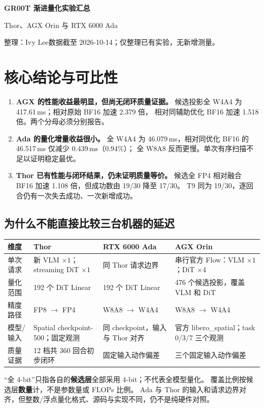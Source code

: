 \documentclass[UTF8,a4paper,11pt,fontset=fandol]{ctexart}
\newcommand{\key}[1]{\textbf{#1}}
\begin{document}
\thispagestyle{plain}
{\huge\bfseries GR00T 渐进量化实验汇总}\par
{\large Thor、AGX Orin 与 RTX 6000 Ada}\par
{\small 整理：Ivy Lee\quad 数据截至 2026-10-14；仅整理已有实验，无新增测量。}
\vspace{5pt}

\section{核心结论与可比性}
\begin{enumerate}
  \item \key{AGX 的性能收益最明显，但尚无闭环质量证据。}
  候选投影全 W4A4 为 417.61\,ms；相对原始 BF16 加速 2.379 倍，
  相对同辅助优化 BF16 加速 1.518 倍。两个分母必须分别报告。
  \item \key{Ada 的量化增量收益很小。}
  全 W4A4 为 46.079\,ms，相对同优化 BF16 的 46.517\,ms 仅减少 0.439\,ms（0.94\%）；
  全 W8A8 反而更慢。单次有序扫描不足以证明稳定最优。
  \item \key{Thor 已有性能与闭环结果，仍未证明质量等价。}
  候选全 FP4 相对融合 BF16 加速 1.108 倍，但成功数由 19/30 降至 17/30。
  T9 同为 19/30，逐回合仍有一次失去成功、一次新增成功。
\end{enumerate}

\subsection{为什么不能直接比较三台机器的延迟}
\begin{center}\small
\begin{tabularx}{\linewidth}{lXXX}
\toprule
维度 & Thor & RTX 6000 Ada & AGX Orin\\\midrule
单次请求 & 新 VLM $\times1$；streaming DiT $\times1$ & 同 Thor 请求边界 & 串行官方 Flow：VLM $\times1$；DiT $\times4$\\
量化范围 & 192 个 DiT Linear & 192 个 DiT Linear & 476 个候选投影，覆盖 VLM 和 DiT\\
精度路径 & FP8 $\rightarrow$ FP4 & W8A8 $\rightarrow$ W4A4 & W8A8 $\rightarrow$ W4A4\\
模型/输入 & Spatial checkpoint-500；固定观测 & 同 checkpoint，输入与 Thor 对齐 & 官方 libero\_spatial；task 0/3/7 三个观测\\
质量证据 & 12 档共 360 回合初步闭环 & 固定输入动作偏差 & 三个固定输入动作偏差\\
\bottomrule
\end{tabularx}
\end{center}
“全 4-bit”只指各自的\key{候选层}全部采用 4-bit；不代表全模型量化。
覆盖比例按候选层\key{数量}计，不是参数量或 FLOPs 比例。
Ada 与 Thor 的输入和请求边界对齐，但整数/浮点量化格式、源码与实现不同，仍不是纯硬件对照。
\end{document}

